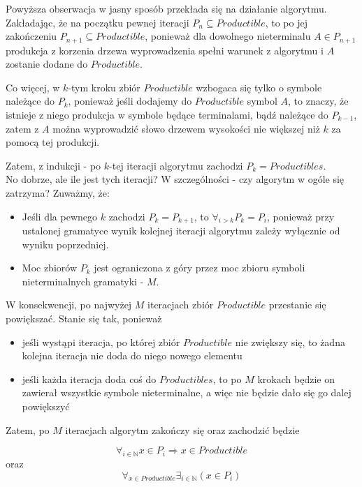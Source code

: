 \documentclass[a4paper,11pt]{article}
\begin{document}
Powyższa obserwacja w jasny sposób przekłada się na działanie algorytmu.
Zakładając, że na początku pewnej iteracji $P_{n} \subseteq Productible$, to po
jej zakończeniu $P_{n+1} \subseteq Productible$, ponieważ dla dowolnego nieterminalu
$A \in P_{n+1}$ produkcja z korzenia drzewa wyprowadzenia spełni warunek z
algorytmu i $A$ zostanie dodane do $Productible$.

Co więcej, w $k$-tym kroku zbiór $Productible$ wzbogaca się tylko o symbole
należące do $P_{k}$, ponieważ jeśli dodajemy do $Productible$ symbol $A$,
to znaczy, że istnieje z niego produkcja w symbole będące terminalami, bądź
należące do $P_{k-1}$, zatem z $A$ można wyprowadzić słowo drzewem wysokości nie
większej niż $k$ za pomocą tej produkcji.

Zatem, z indukcji - po $k$-tej iteracji algorytmu zachodzi
$P_{k} = Productibles$. \\


No dobrze, ale ile jest tych iteracji? W szczególności - czy algorytm w ogóle
się zatrzyma? Zuważmy, że:
\begin{itemize}
  \item{Jeśli dla pewnego $k$ zachodzi $P_{k} = P_{k+1}$, to $\forall_{i > k}
        P_{k} = P_{i}$, ponieważ przy ustalonej gramatyce wynik kolejnej
        iteracji algorytmu zależy wyłącznie od wyniku poprzedniej.}
  \item{Moc zbiorów $P_{k}$ jest ograniczona z góry przez moc zbioru symboli
        nieterminalnych gramatyki - $M$.}
\end{itemize}
W konsekwencji, po najwyżej $M$ iteracjach zbiór $Productible$ przestanie się
powiększać. Stanie się tak, ponieważ
\begin{itemize}
  \item{jeśli wystąpi iteracja, po której zbiór $Productible$ nie zwiększy się,
        to żadna kolejna iteracja nie doda do niego nowego elementu}
  \item{jeśli każda iteracja doda coś do $Productibles$, to po $M$ krokach
        będzie on zawierał wszystkie symbole nieterminalne, a więc nie będzie
        dało się go dalej powiększyć}
\end{itemize}

Zatem, po $M$ iteracjach algorytm zakończy się oraz zachodzić będzie

\begin{displaymath}
  \forall_{i \in \mathbb{N}} x \in P_{i} \Rightarrow x \in Productible
\end{displaymath}
  oraz
\begin{displaymath}
  \forall_{x \in Productible} \exists_{i \in \mathbb{N}} (x \in P_{i})
\end{displaymath}
\end{document}
